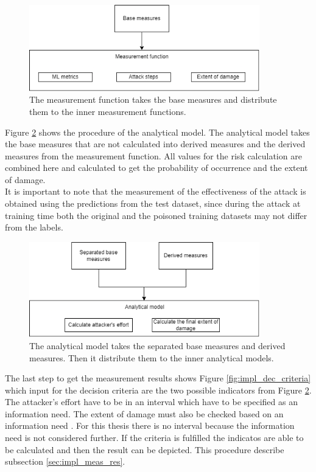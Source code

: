 \begin{figure}[ht!]
  \centering
  \includegraphics[width=10cm]{pictures/impl_meas_func.png}
  \caption{The measurement function takes the base measures and distribute them to the inner measurement functions.}
  \label{fig:impl_meas_func}
\end{figure}

Figure \ref{fig:impl_ana_mod} shows the procedure of the analytical model. The analytical model takes the base measures that are not calculated into derived measures and the derived measures from the measurement function. All values for the risk calculation are combined here and calculated to get the probability of occurrence and the extent of damage. \\ It is important to note that the measurement of the effectiveness of the attack is obtained using the predictions from the test dataset, since during the attack at training time both the original and the poisoned training datasets may not differ from the labels.

\begin{figure}[ht!]
  \centering
  \includegraphics[width=10cm]{pictures/impl_ana_mod.png}
  \caption{The analytical model takes the separated base measures and derived measures. Then it distribute them to the inner analytical models.}
  \label{fig:impl_ana_mod}
\end{figure}

The last step to get the measurement results shows Figure \ref{fig:impl_dec_criteria} which input for the decision criteria are the two possible indicators from Figure \ref{fig:impl_ana_mod}. The attacker's effort have to be in an interval which have to be specified as an information need. The extent of damage must also be checked based on an information need \cite{ISO_27004_2009}. For this thesis there is no interval because the information need is not considered further. If the criteria is fulfilled the indicatos are able to be calculated and then the result can be depicted. This procedure describe subsection \ref{sec:impl_meas_res}.

